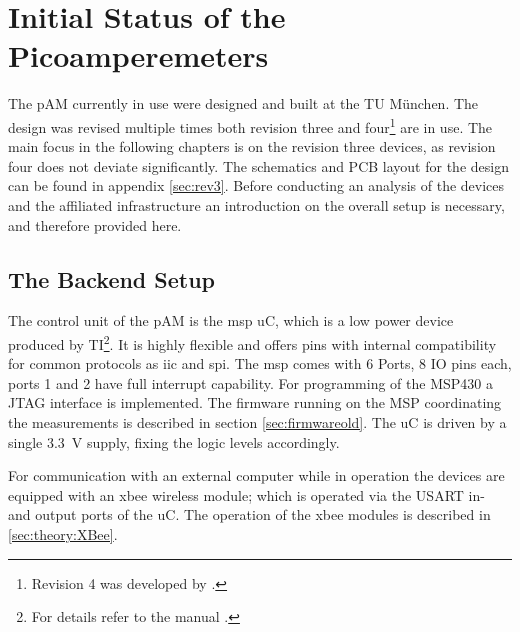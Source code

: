 \chapter{Initial Status of the Picoamperemeters}
\label{sec:current_status}
The \ac{pAM} currently in use were designed and built at the TU München. The design was revised multiple times both revision three and four\footnote{Revision 4 was developed by \cite{bugl}.} are in use. The main focus in the following chapters is on the revision three devices, as revision four does not deviate significantly.
The schematics and PCB layout for the design can be found in appendix \ref{sec:rev3}. Before conducting an analysis of the devices and the affiliated infrastructure an introduction on the overall setup is necessary, and therefore provided here.
\section{The Backend Setup}
The control unit of the \ac{pAM} is the \ac{msp} \ac{uC}, which is a low power device produced by \ac{TI}\footnote{For details refer to the manual \cite{msp_manual}.}. It is highly flexible and offers pins with internal compatibility for common protocols as \ac{iic} and \ac{spi}. The \ac{msp} comes with 6 Ports, 8 \ac{IO} pins each, ports 1 and 2 have full interrupt capability. For programming of the MSP430 a JTAG interface is implemented. The firmware running on the MSP coordinating the measurements is described in section \ref{sec:firmwareold}.
The \ac{uC} is driven by a single \SI{3.3}{\volt} supply, fixing the logic levels accordingly.

For communication with an external computer while in operation the devices are equipped with an \acs{xbee} wireless module; which is operated via the USART in- and output ports of the \ac{uC}. The operation of the \acs{xbee} modules is described in \ref{sec:theory:XBee}.

